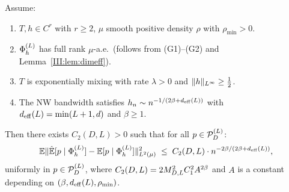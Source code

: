 \begin{proposition}
\label{III:prop:source2}
Assume:
\begin{enumerate}[label=(\roman*)]
  \item $T, h \in C^r$ with $r \geq 2$, $\mu$ smooth positive density $\rho$
        with $\rho_{\min} > 0$.
  \item $\Phi_h^{(L)}$ has full rank $\mu$-a.e.\ (follows from (G1)--(G2) and
        Lemma~\ref{III:lem:dimeff}).
  \item $T$ is exponentially mixing with rate $\lambda > 0$ and
        $\|h\|_{L^{\infty}} \geq \frac{1}{2}$.
  \item The NW bandwidth satisfies $h_n \sim n^{-1/(2\beta+d_{\mathrm{eff}}(L))}$
        with $d_{\mathrm{eff}}(L) = \min(L+1, d)$ and $\beta \geq 1$.
\end{enumerate}
Then there exists $C_2(D,L) > 0$ such that for all $p \in \mathcal{P}_D^{(L)}$:
\[
  \mathbb{E}\|\hat{\mathbb{E}}[p \mid \Phi_h^{(L)}] - \mathbb{E}[p \mid \Phi_h^{(L)}]\|_{L^{2}(\mu)}^2
  \;\leq\; C_2(D,L)\cdot n^{-2\beta/(2\beta+d_{\mathrm{eff}}(L))},
\]
uniformly in $p \in \mathcal{P}_D^{(L)}$, where $C_2(D,L) = 2M_{D,L}^2 C_1^2 A^{2\beta}$ and
$A$ is a constant depending on $(\beta, d_{\mathrm{eff}}(L), \rho_{\min})$.
\end{proposition}

